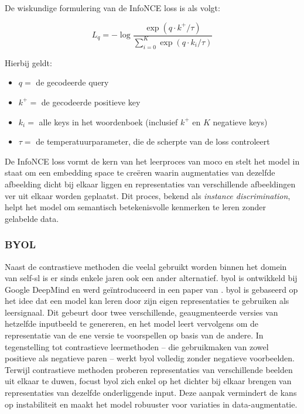 De wiskundige formulering van de InfoNCE loss is als volgt:

$$
L_q = - \log \frac{\exp{(q \cdot k^+ / {\tau})}}{\sum_{i=0}^{K}\exp{(q \cdot k_i / {\tau})}}
$$

Hierbij geldt:

\begin{itemize}
    \item $q =$ de gecodeerde query
    \item $k^+ =$ de gecodeerde positieve key
    \item $k_i =$ alle keys in het woordenboek (inclusief $k^+$ en $K$ negatieve keys)
    \item $\tau =$ de temperatuurparameter, die de scherpte van de loss controleert  
\end{itemize}

De InfoNCE loss vormt de kern van het leerproces van \gls{moco} en stelt het model in staat om een embedding space te creëren waarin augmentaties van dezelfde afbeelding dicht bij elkaar liggen en representaties van verschillende afbeeldingen ver uit elkaar worden geplaatst. Dit proces, bekend als \emph{instance discrimination}, helpt het model om semantisch betekenisvolle kenmerken te leren zonder gelabelde data.

\subsubsection{BYOL}

Naast de contrastieve methoden die veelal gebruikt worden binnen het domein van \gls{self-sl} is er sinds enkele jaren ook een ander alternatief. \gls{byol} is ontwikkeld bij Google DeepMind en werd geïntroduceerd in een paper van \textcite{Grill_2020}. \gls{byol} is gebaseerd op het idee dat een model kan leren door zijn eigen representaties te gebruiken als leersignaal. Dit gebeurt door twee verschillende, geaugmenteerde versies van hetzelfde inputbeeld te genereren, en het model leert vervolgens om de representatie van de ene versie te voorspellen op basis van de andere. In tegenstelling tot contrastieve leermethoden -- die gebruikmaken van zowel positieve als negatieve paren -- werkt \gls{byol} volledig zonder negatieve voorbeelden. Terwijl contrastieve methoden proberen representaties van verschillende beelden uit elkaar te duwen, focust \gls{byol} zich enkel op het dichter bij elkaar brengen van representaties van dezelfde onderliggende input. Deze aanpak vermindert de kans op instabiliteit en maakt het model robuuster voor variaties in data-augmentatie. \\

